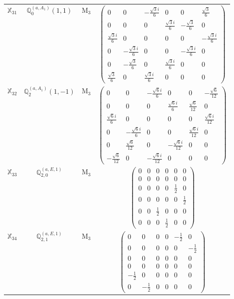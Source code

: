 \documentclass[fleqn,10pt,landscape]{article}
\begin{document}
\begin{itemize}
\begin{center}
\begin{longtable}{c|c|c|c}
$ \mathbb{X}_{31} $ & $\mathbb{Q}_{0}^{(a,A_{1})}(1,1)$ & M$_{3}$ & $\begin{pmatrix} 0 & 0 & - \frac{\sqrt{3} i}{6} & 0 & 0 & \frac{\sqrt{3}}{6} \\ 0 & 0 & 0 & \frac{\sqrt{3} i}{6} & - \frac{\sqrt{3}}{6} & 0 \\ \frac{\sqrt{3} i}{6} & 0 & 0 & 0 & 0 & - \frac{\sqrt{3} i}{6} \\ 0 & - \frac{\sqrt{3} i}{6} & 0 & 0 & - \frac{\sqrt{3} i}{6} & 0 \\ 0 & - \frac{\sqrt{3}}{6} & 0 & \frac{\sqrt{3} i}{6} & 0 & 0 \\ \frac{\sqrt{3}}{6} & 0 & \frac{\sqrt{3} i}{6} & 0 & 0 & 0 \end{pmatrix}$ \\
$ \mathbb{X}_{32} $ & $\mathbb{Q}_{2}^{(a,A_{1})}(1,-1)$ & M$_{3}$ & $\begin{pmatrix} 0 & 0 & - \frac{\sqrt{6} i}{6} & 0 & 0 & - \frac{\sqrt{6}}{12} \\ 0 & 0 & 0 & \frac{\sqrt{6} i}{6} & \frac{\sqrt{6}}{12} & 0 \\ \frac{\sqrt{6} i}{6} & 0 & 0 & 0 & 0 & \frac{\sqrt{6} i}{12} \\ 0 & - \frac{\sqrt{6} i}{6} & 0 & 0 & \frac{\sqrt{6} i}{12} & 0 \\ 0 & \frac{\sqrt{6}}{12} & 0 & - \frac{\sqrt{6} i}{12} & 0 & 0 \\ - \frac{\sqrt{6}}{12} & 0 & - \frac{\sqrt{6} i}{12} & 0 & 0 & 0 \end{pmatrix}$ \\
$ \mathbb{X}_{33} $ & $\mathbb{Q}_{2,0}^{(a,E,1)}$ & M$_{3}$ & $\begin{pmatrix} 0 & 0 & 0 & 0 & 0 & 0 \\ 0 & 0 & 0 & 0 & 0 & 0 \\ 0 & 0 & 0 & 0 & \frac{1}{2} & 0 \\ 0 & 0 & 0 & 0 & 0 & \frac{1}{2} \\ 0 & 0 & \frac{1}{2} & 0 & 0 & 0 \\ 0 & 0 & 0 & \frac{1}{2} & 0 & 0 \end{pmatrix}$ \\
$ \mathbb{X}_{34} $ & $\mathbb{Q}_{2,1}^{(a,E,1)}$ & M$_{3}$ & $\begin{pmatrix} 0 & 0 & 0 & 0 & - \frac{1}{2} & 0 \\ 0 & 0 & 0 & 0 & 0 & - \frac{1}{2} \\ 0 & 0 & 0 & 0 & 0 & 0 \\ 0 & 0 & 0 & 0 & 0 & 0 \\ - \frac{1}{2} & 0 & 0 & 0 & 0 & 0 \\ 0 & - \frac{1}{2} & 0 & 0 & 0 & 0 \end{pmatrix}$ \\

\end{longtable}
\end{center}
\end{itemize}
\end{document}
